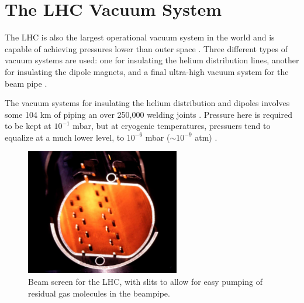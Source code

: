 \section{The LHC Vacuum System}
\label{lhc_vacuum_overview}

\par The LHC is also the largest operational vacuum system in the
world and is capable of achieving pressures lower than outer space
\cite{LHC:LHC_lhc_vacuum_cernWebsite}.  Three different types of
vacuum systems are used: one for insulating the helium distribution
lines, another for insulating the dipole magnets, and a final
ultra-high vacuum system for the beam pipe
\cite{lhc:machine_description}.  

\par The vacuum systems for insulating the helium distribution and
dipoles involves some 104 km of piping an over 250,000 welding
joints \cite{LHC:LHC_lhc_vacuum_cernWebsite}.  Pressure here is
required to be kept at $10^{-1}$ mbar, but at cryogenic temperatures,
pressuers tend to equalize at a much lower level, to $10^{-6}$ mbar
($\sim10^{-9}$ atm) \cite{lhc:machine_description}.   

\begin{figure}[h]
   \centering
  \includegraphics[width=0.6\textwidth]{Figures/LHC_Diagrams/LHC_BeamScreen.jpg}
  \caption{Beam screen for the LHC, with slits to allow for easy
    pumping of residual gas molecules in the beampipe.} \label{fig:lhc_beam_screen}
\end{figure}

